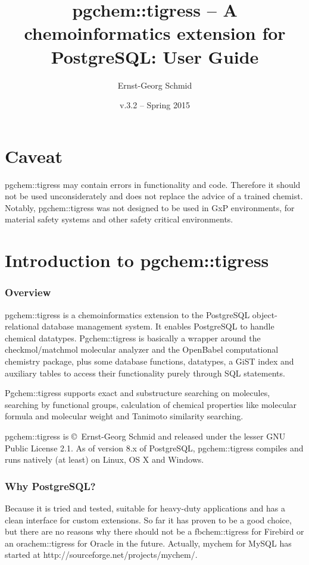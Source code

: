 \documentclass[a4paper]{article}
\begin{document}
\title{pgchem::tigress -- A chemoinformatics extension for PostgreSQL: User Guide}
\author{Ernst-Georg Schmid}
\date{v.3.2	-- Spring 2015}
\maketitle%
\newpage
\tableofcontents\newpage
\part{Caveat}
pgchem::tigress may contain errors in functionality and code. Therefore it should not be used unconsiderately and does not replace the advice of a trained chemist.
Notably, pgchem::tigress was not designed to be used in GxP environments, for material safety systems and other safety critical environments.
\part{Introduction to pgchem::tigress}
\section{Overview}
pgchem::tigress is a chemoinformatics extension to the PostgreSQL object-relational database management system. It enables PostgreSQL to handle chemical datatypes. Pgchem::tigress is basically a wrapper around the checkmol/matchmol molecular analyzer and the OpenBabel computational chemistry package, plus some database functions, datatypes, a GiST index and auxiliary tables to access their functionality purely through SQL statements.\par
Pgchem::tigress supports exact and substructure searching on molecules, searching by functional groups, calculation of chemical properties like molecular formula and molecular weight and Tanimoto similarity searching.\par
pgchem::tigress is \copyright~Ernst-Georg Schmid and released under the lesser GNU Public License 2.1.
As of version 8.x of PostgreSQL, pgchem::tigress compiles and runs natively (at least) on Linux, OS X and Windows. 
\section{Why PostgreSQL?}
Because it is tried and tested, suitable for heavy-duty applications and has a clean interface for custom extensions. So far it has proven to be a good choice, but there are no reasons why there should not be a fbchem::tigress for Firebird or an orachem::tigress for Oracle in the future. Actually, mychem for MySQL has started at http://sourceforge.net/projects/mychem/.
\end{document}

